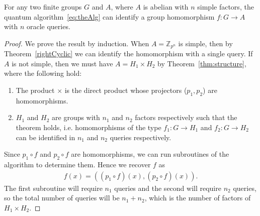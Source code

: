 \begin{theorem}\label{thm:intoAbThm}
For any two finite groups $G$ and $A$, where $A$ is abelian with $n$ simple factors, the quantum algorithm~\eqref{eq:theAlg} can identify a group homomorphism $f:G \to A$ with $n$ oracle queries.
\end{theorem}
\begin{proof}
We prove the result by induction. 
\newline\newline
{} When $A=\mathbb{Z}_{p^n}$ is simple, then by Theorem~\ref{rightCyclic} we can identify the homomorphism with a single query.
\newline\newline
{} If $A$ is not simple, then we must have $A=H_1\times H_2$ by Theorem~\ref{thm:structure}, where the following hold:
\begin{enumerate}

\item The product $\times$ is the direct product whose projectors ($p_1,p_2$) are homomorphisms.

\item  $H_1$ and $H_2$ are groups with $n_1$ and $n_2$ factors respectively such  that the theorem holds, i.e. homomorphisms of the type $f_{1}:G\to H_1$ and $f_{2}:G\to H_2$  can be identified in $n_1$ and $n_2$ queries respectively.

\end{enumerate} 
Since $p_1\circ f$ and $p_2\circ f$ are homomorphisms, we can run subroutines of the algorithm to determine them. Hence we recover $f$ as
\begin{align*}
f(x) = ( (p_1\circ f)(x),(p_2\circ f)(x) ).
\end{align*}
The first subroutine will require $n_1$ queries and the second will require $n_2$ queries, so the total number of queries will be $n_1+n_2$, which is the number of factors of $H_1\times H_2$.
\end{proof}



